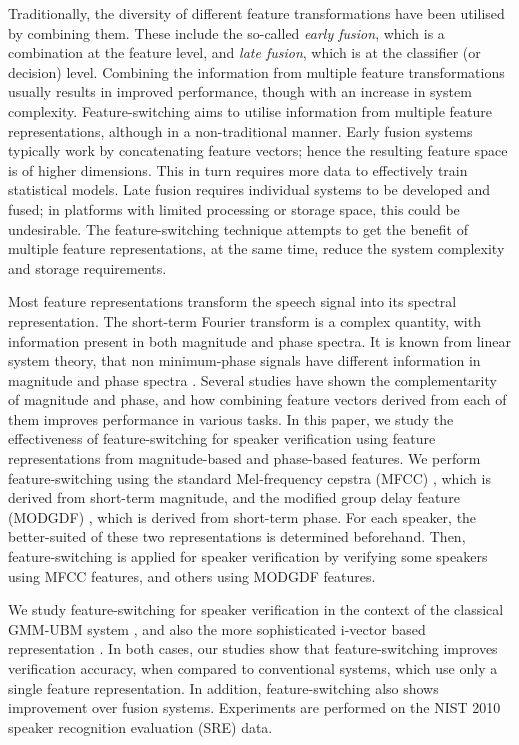 \documentclass{article}
\begin{document}
Traditionally, the diversity of different feature transformations have been
utilised by combining them. These include the so-called \emph{early fusion},
which is a combination at the feature level, and \emph{late fusion}, which is at
the classifier (or decision) level. Combining the information from multiple
feature transformations usually results in improved performance, though
with an increase in system complexity. Feature-switching aims to utilise
information from multiple feature representations, although in a non-traditional
manner. Early fusion systems typically work by concatenating feature vectors;
hence the resulting feature space is of higher dimensions. This in turn requires
more data to effectively train statistical models. Late fusion requires
individual systems to be developed and fused; in platforms with limited
processing or storage space, this could be undesirable. The feature-switching technique
attempts to get the benefit of multiple feature representations, at the same
time, reduce the system complexity and storage requirements.

Most feature representations transform the speech signal into its spectral
representation. The short-term Fourier transform is a complex quantity, with
information present in both magnitude and phase spectra. It is known from linear
system theory, that non minimum-phase signals have different information in
magnitude and phase spectra \cite{oppenheim}. Several studies \cite{complement2}
have shown the complementarity of magnitude and phase, and how combining feature
vectors derived from each of them improves performance in various tasks. In this
paper, we study the effectiveness of feature-switching for speaker verification
using feature representations from magnitude-based and phase-based features. We
perform feature-switching using the standard Mel-frequency cepstra (MFCC)
\cite{mfcc}, which is derived from short-term magnitude, and the modified group delay feature
(MODGDF) \cite{hegdeModgdf}, which is derived from short-term phase. For each speaker, the
better-suited of these two representations is determined beforehand. Then,
feature-switching is applied for speaker verification by verifying some speakers
using MFCC features, and others using MODGDF features.

We study feature-switching for speaker verification in the context of the
classical GMM-UBM system \cite{reynoldsAdaptedGMM}, and also the more
sophisticated i-vector based representation \cite{dehak_ivector}. In both cases,
our studies show that feature-switching improves verification accuracy, when
compared to conventional systems, which use only a single feature
representation. In addition, feature-switching also shows improvement over
fusion systems. Experiments are performed on the NIST 2010 speaker recognition
evaluation (SRE) \cite{nist2010SRE} data.
\end{document}
